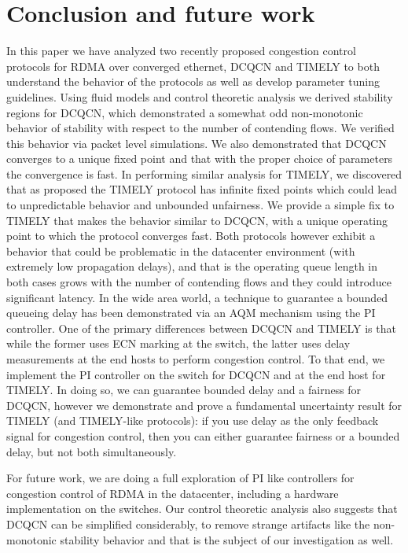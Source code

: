 \section{Conclusion and future work}
In this paper we have analyzed two recently proposed congestion control
protocols for RDMA over converged ethernet, DCQCN and TIMELY to both
understand the behavior of the protocols as well as develop parameter
tuning guidelines. Using
fluid models and control theoretic analysis we derived stability regions
for DCQCN, which demonstrated a somewhat odd non-monotonic behavior of
stability with respect to the number of contending flows. We verified
this behavior via packet level simulations. We also demonstrated that DCQCN
converges to a unique fixed point and that with the proper choice of
parameters the convergence is fast. In performing similar analysis
for TIMELY, we discovered that as proposed the TIMELY protocol has
infinite fixed points which could lead to unpredictable behavior and
unbounded unfairness. We provide a simple fix to TIMELY that makes the
behavior similar to DCQCN, with a unique operating point to which the
protocol converges fast. Both protocols however exhibit a behavior that
could be problematic in the datacenter environment (with extremely low
propagation delays), and that is the
operating queue length in both cases grows with the number of
contending flows and they could introduce significant latency. In the
wide area world, a technique to guarantee a bounded queueing delay has
been demonstrated via an AQM mechanism using the PI controller. One of
the primary differences between DCQCN and TIMELY is that while the
former uses ECN marking at the switch, the latter uses delay
measurements at the end hosts to perform congestion control. To that
end, we implement the PI controller on the switch for DCQCN and at the
end host for TIMELY. In doing so, we can guarantee bounded delay and a
fairness for
DCQCN, however we demonstrate and prove a fundamental uncertainty
result for TIMELY (and TIMELY-like protocols): if you use delay as the only
feedback signal for congestion control, then you can either guarantee
fairness or a bounded delay, but not both simultaneously.

For future work, we are doing a full exploration of PI like
controllers for congestion control of RDMA in the datacenter,
including a hardware implementation on the switches. Our control
theoretic analysis also suggests that DCQCN can be simplified
considerably, to remove strange artifacts like the non-monotonic
stability behavior and that is the subject of our investigation as well.

